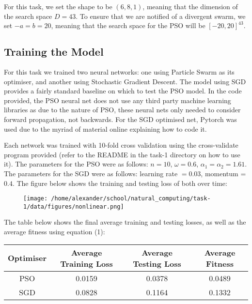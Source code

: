 \documentclass[12pt]{article}
\begin{document}
For this task, we set the shape to be $\left(6, 8, 1\right)$, meaning that the dimension of the search space $D=43$. 
To ensure that we are notified of a divergent swarm, we set $-a=b=20$, meaning that the search space for the PSO will be $\left[-20,20\right]^{43}$. 

\subsection{Training the Model}
For this task we trained two neural networks: one using Particle Swarm as its optimiser, and another using Stochastic Gradient Descent.
The model using SGD provides a fairly standard baseline on which to test the PSO model. 
In the code provided, the PSO neural net does not use any third party machine learning libraries as due to the nature of PSO, these neural nets only needed to consider forward propagation, not backwards.
For the SGD optimised net, Pytorch was used due to the myriad of material online explaining how to code it. 

Each network was trained with 10-fold cross validation using the cross-validate program provided (refer to the README in the task-1 directory on how to use it). 
The parameters for the PSO were as follows: $n=10$, $\omega=0.6$, $\alpha_1 = \alpha_2 = 1.61$. 
The parameters for the SGD were as follows: learning rate $=0.03$, momentum = $0.4$.
The figure below shows the training and testing loss of both over time:

\begin{figure}[h]                   
      \begin{center}                  
          \texttt{[image: /home/alexander/school/natural\_computing/task-1/data/figures/nonlinear.png]}    
      \end{center}                                                                                              
\end{figure}
The table below shows the final average training and testing losses, as well as the average fitness using equation (1):
\begin{center}
 \begin{tabular}{||c c c c||} 
 \hline
 Optimiser & Average Training Loss & Average Testing Loss & Average Fitness \\ [0.5ex] 
 \hline\hline
 PSO & 0.0159 & 0.0378 & 0.0489 \\ 
 \hline
 SGD & 0.0828 & 0.1164 & 0.1332 \\
 \hline
\end{tabular}
\end{center}
\end{document}
